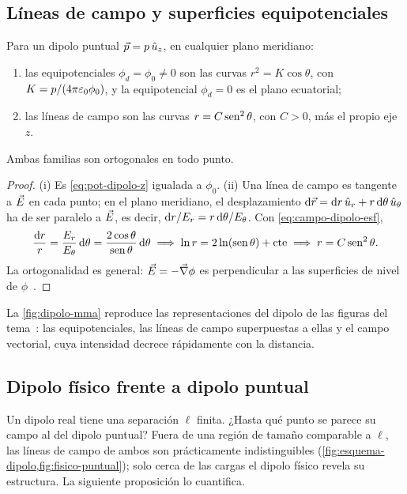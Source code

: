 \subsection{Líneas de campo y superficies equipotenciales}\label{sec:dipolo-lineas}
\begin{proposicion}\label{prop:lineas-dipolo}
Para un dipolo puntual $\vec{p}=p\,\hat{u}_{z}$, en cualquier plano meridiano:
\begin{enumerate}[label=(\roman*)]
  \item las equipotenciales $\phi_{d}=\phi_0\neq0$ son las curvas $r^{2}=K\cos\theta$, con $K=p/(4\pi\varepsilon_{0}\phi_0)$, y la equipotencial $\phi_{d}=0$ es el plano
        ecuatorial;
  \item las líneas de campo son las curvas $r=C\operatorname{sen}^{2}\theta$, con $C>0$, más el propio eje $z$.
\end{enumerate}
Ambas familias son ortogonales en todo punto.
\end{proposicion}
\begin{proof}
(i) Es \cref{eq:pot-dipolo-z} igualada a $\phi_0$. (ii) Una línea de campo es tangente a $\vec{E}$ en cada punto; en el plano meridiano, el desplazamiento
$\mathrm{d}\vec{r}=\mathrm{d} r\,\hat{u}_{r}+r\,\mathrm{d}\theta\,\hat{u}_{\theta}$ ha de ser paralelo a $\vec{E}$, es decir, $\mathrm{d} r/E_r=r\,\mathrm{d}\theta/E_\theta$. Con \cref{eq:campo-dipolo-esf},
\[
  \frac{\mathrm{d} r}{r}=\frac{E_r}{E_\theta}\,\mathrm{d}\theta=\frac{2\cos\theta}{\operatorname{sen}\theta}\,\mathrm{d}\theta
  \;\Longrightarrow\;\ln r=2\ln(\operatorname{sen}\theta)+\text{cte}\;\Longrightarrow\; r=C\operatorname{sen}^{2}\theta .
\]
La ortogonalidad es general: $\vec{E}=-\vec{\nabla}\phi$ es perpendicular a las superficies de nivel de $\phi$~\cite{TEMA1}.
\end{proof}

La \cref{fig:dipolo-mma} reproduce las representaciones del dipolo de las figuras del tema~\cite{FIGURAS-T2}: las equipotenciales,
las líneas de campo superpuestas a ellas y el campo vectorial, cuya intensidad decrece rápidamente con la distancia.



\subsection{Dipolo físico frente a dipolo puntual}\label{sec:fisico-puntual}
Un dipolo real tiene una separación $\ell$ finita. ¿Hasta qué punto se parece su campo al del dipolo puntual? Fuera de una región de
tamaño comparable a $\ell$, las líneas de campo de ambos son prácticamente indistinguibles (\cref{fig:esquema-dipolo,fig:fisico-puntual}); solo
cerca de las cargas el dipolo físico revela su estructura. La siguiente proposición lo cuantifica.

